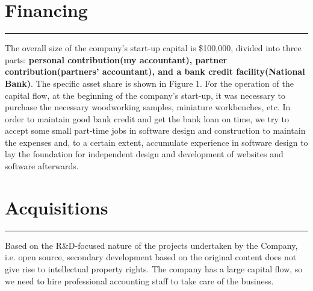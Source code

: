 \documentclass[12pt]{extarticle}
\numberwithin{figure}{section}
\begin{document}
\section{Financing}
\vspace{-0.1cm}
\hrule
\vspace{0.2cm}
The overall size of the company's start-up capital is \$100,000, divided into three parts: \textbf{personal contribution(my accountant), partner contribution(partners' accountant), and a bank credit facility(National Bank)}. The specific asset share is shown in Figure 1. For the operation of the capital flow, at the beginning of the company's start-up, it was necessary to purchase the necessary woodworking samples, miniature workbenches, etc. In order to maintain good bank credit and get the bank loan on time, we try to accept some small part-time jobs in software design and construction to maintain the expenses and, to a certain extent, accumulate experience in software design to lay the foundation for independent design and development of websites and software afterwards.

\begin{figure}[h]
    \centering
    \hspace{8mm}
\end{figure}

\section{Acquisitions}
\vspace{-0.1cm}
\hrule
\vspace{0.2cm}
Based on the R\&D-focused nature of the projects undertaken by the Company, i.e. open source, secondary development based on the original content does not give rise to intellectual property rights. The company has a large capital flow, so we need to hire professional accounting staff to take care of the business.
\end{document}
